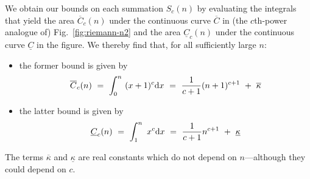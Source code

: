 We obtain our bounds on each summation $S_c(n)$ by evaluating the integrals that yield the area $\overline{C}_c(n)$ under the continuous curve $\overline{C}$ in (the $c$th-power analogue of) Fig.~\ref{fig:riemann-n2} and the area $\underline{C}_c(n)$ under the continuous curve $\underline{C}$ in the figure.  We thereby find that, for all sufficiently large $n$:
\begin{itemize}
\item
the former bound is given by
\begin{equation}
\label{eq:upper-integral-xc}
\overline{C}_c(n) \ = \
\int_0^n \ (x+1)^c {\rm d}x \ = \
 \frac{1}{c+1} (n+1)^{c+1} \ + \ \overline{\kappa}
\end{equation}

\medskip\item
the latter bound is given by
\begin{equation}
\label{eq:lower-integral-xc}
\underline{C}_c(n) \ = \
\int_1^n \ x^c {\rm d}x \ = \ \frac{1}{c+1} n^{c+1} \ + \ \underline{\kappa}
\end{equation}
\end{itemize}
The terms $\overline{\kappa}$ and $\underline{\kappa}$ are real constants which do not depend on $n$---although they could depend on $c$.

\medskip


